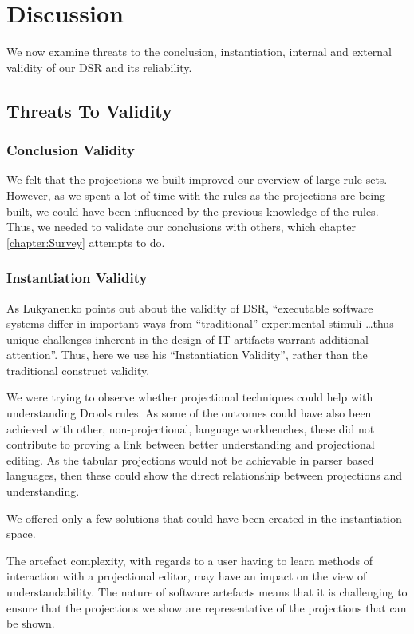 \section{Discussion}
\label{section:dsr_discussion}

We now examine threats to the conclusion, instantiation, internal and external validity of our DSR and its reliability.

\subsection{Threats To Validity} 

\subsubsection{Conclusion Validity}
We felt that the projections we built improved our overview of large rule sets.
However, as we spent a lot of time with the rules as the projections are being built, we could have been influenced by the previous knowledge of the rules.
Thus, we needed to validate our conclusions with others, which chapter \ref{chapter:Survey} attempts to do.

\subsubsection{Instantiation Validity}
As Lukyanenko\cite{Lukyanenko_2014} points out about the validity of DSR, ``executable software systems differ in important ways from ``traditional'' experimental stimuli \dots thus unique challenges inherent in the design of IT artifacts warrant additional attention''.
Thus, here we use his ``Instantiation Validity'', rather than the traditional construct validity.

We were trying to observe whether projectional techniques could help with understanding Drools rules. 
As some of the outcomes could have also been achieved with other, non-projectional, language workbenches, these did not contribute to proving a link between better understanding and projectional editing.
As the tabular projections would not be achievable in parser based languages, then these could show the direct relationship between projections and understanding.

We offered only a few solutions that could have been created in the instantiation space.

The artefact complexity, with regards to a user having to learn methods of interaction with a projectional editor, may have an impact on the view of understandability.
The nature of software artefacts means that it is challenging to ensure that the projections we show are representative of the projections that can be shown.

